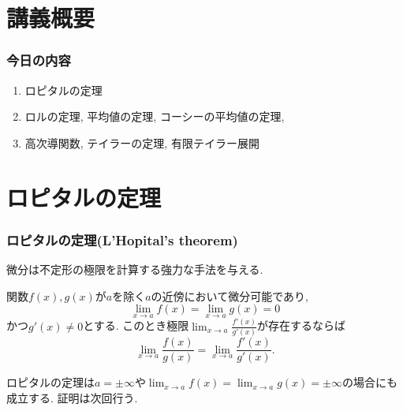 \section{講義概要}


\begin{frame}
\frametitle{今日の内容}



\begin{enumerate}
\item ロピタルの定理
\item ロルの定理, 平均値の定理, コーシーの平均値の定理, 
\item 高次導関数, テイラーの定理, 有限テイラー展開
\end{enumerate} 



\end{frame}


\section{ロピタルの定理}

\begin{frame}
\frametitle{ロピタルの定理(L'Hopital's theorem)}

微分は不定形の極限を計算する強力な手法を与える. 

\begin{Thm}[ロピタルの定理]
関数$f(x),g(x)$が$a$を除く$a$の近傍において微分可能であり, 
$$
\lim_{x\to a}f(x) = \lim_{x\to a}g(x)=0
$$
かつ$g'(x) \ne0$とする. このとき極限$\displaystyle \lim_{x\to a}\frac{f'(x)}{g'(x)}$が存在するならば
$$
\lim_{x\to a}\frac{f(x)}{g(x)} = \lim_{x\to a}\frac{f'(x)}{g'(x)}. 
$$
\end{Thm}

ロピタルの定理は$a=\pm \infty$や$\displaystyle \lim_{x\to a}f(x) = \lim_{x\to a}g(x)=\pm \infty$の場合にも成立する. 
証明は次回行う. 

\end{frame}




